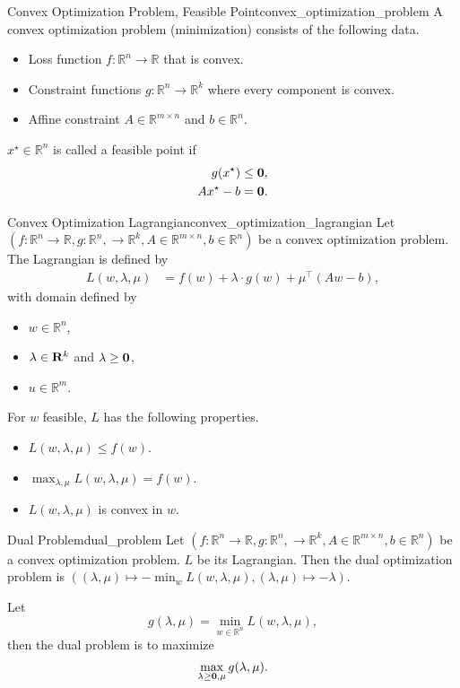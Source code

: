 \documentclass{article}
\begin{document}
\begin{definition}{Convex Optimization Problem, Feasible Point}{convex_optimization_problem}
    A convex optimization problem (minimization) consists of the following data.
    \begin{itemize}
        \item Loss function $f:\mathbb{R}^n\rightarrow\mathbb{R}$ that is convex.
        \item Constraint functions $g:\mathbb{R}^n \rightarrow \mathbb{R}^k$ where every component is convex.
        \item Affine constraint $A\in\mathbb{R}^{m\times n}$ and $b\in\mathbb{R}^{n}$.
    \end{itemize}
    $x^\star\in\mathbb{R}^n$ is called a feasible point if
    \begin{align*}
        g(x^\star) &\le \vb{0}, \\
        Ax^\star - b &= \vb{0}.
    \end{align*}
\end{definition}

\begin{definition}{Convex Optimization Lagrangian}{convex_optimization_lagrangian}
    Let $(f:\mathbb{R}^n \rightarrow \mathbb{R},g:\mathbb{R}^n,\rightarrow\mathbb{R}^k,A\in \mathbb{R}^{m\times n},b\in \mathbb{R}^n)$ be a convex optimization problem.
    The Lagrangian is defined by
    \begin{align*}
        L(w,\lambda,\mu) &= f(w) + \lambda \cdot g(w) + \mu^\intercal(Aw-b),
    \end{align*}
    with domain defined by
    \begin{itemize}
        \item $w\in\mathbb{R}^n$,
        \item $\lambda\in\vb{R}^k$ and $\lambda \ge \vb{0}$,
        \item $u\in\mathbb{R}^m$.
    \end{itemize}
\end{definition}
For $w$ feasible, $L$ has the following properties.
\begin{itemize}
    \item $L(w,\lambda,\mu) \le f(w)$.
    \item $\max_{\lambda,\mu} L(w,\lambda,\mu) = f(w)$.
    \item $L(w,\lambda,\mu)$ is convex in $w$.
\end{itemize}

\begin{definition}{Dual Problem}{dual_problem}
    Let $(f:\mathbb{R}^n \rightarrow \mathbb{R},g:\mathbb{R}^n,\rightarrow\mathbb{R}^k,A\in \mathbb{R}^{m\times n},b\in \mathbb{R}^n)$ be a convex optimization problem.
    $L$ be its Lagrangian.
    Then the dual optimization problem is $((\lambda,\mu) \mapsto -\min_w L(w,\lambda,\mu),(\lambda,\mu)\mapsto -\lambda)$.
\end{definition}
Let
\[ g(\lambda,\mu) = \min_{w\in\mathbb{R}^n} L(w,\lambda,\mu), \]
then the dual problem is to maximize
\[ \max_{\lambda\ge \vb{0},\mu} g(\lambda,\mu). \]
\end{document}
